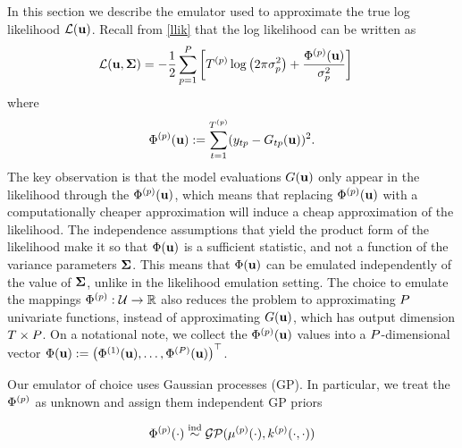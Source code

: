 \documentclass[12pt]{article}
\begin{document}
In this section we describe the emulator used to approximate the true log likelihood $\llik(\bpar)$. Recall from \ref{llik} that the log likelihood can be written as 
\begin{align*}
\llik(\bpar, \CovObs) &= -\frac{1}{2} \sum_{\objIdx = 1}^{\Nobj} \left[\indexObj{\Ntime} \log\left(2\postDens \sdObs_{\objIdx}^2 \right) + \frac{\indexObj{\SSR}(\bpar)}{\sdObs_{\objIdx}^2} \right] 
\end{align*}
where 
\[\indexObj{\SSR}(\bpar) := \sum_{\timeIdx = 1}^{\indexObj{\Ntime}} (\state_{\timeIdx \objIdx} - \fwd_{\timeIdx \objIdx}(\bpar))^2.\]
The key observation 
is that the model evaluations $\fwd(\bpar)$ only appear in the likelihood through the $\indexObj{\SSR}(\bpar)$, which means that replacing $\indexObj{\SSR}(\bpar)$ with a
computationally cheaper approximation will induce a cheap approximation of the likelihood. The independence assumptions 
that yield the product form of the likelihood make it so that $\SSR(\bpar)$ is a sufficient statistic, and not a function of the variance parameters $\CovObs$. 
This means that $\SSR(\bpar)$ can be emulated independently of the value of $\CovObs$, unlike in the likelihood emulation setting. 
The choice to emulate the mappings $\indexObj{\SSR}: \parSpace \to \R$ also reduces the problem to 
approximating $\Nobj$ univariate functions, instead of approximating $\fwd(\bpar)$, which has output dimension $\Ntime \times \Nobj$. On a notational note, we collect the $\indexObj{\SSR}(\bpar)$ values into a $\Nobj$-dimensional 
vector $\SSR(\bpar) := \begin{pmatrix} \indexObj[1]{\SSR}(\bpar), \dots, \indexObj[\Nobj]{\SSR}(\bpar) \end{pmatrix}^\top$.  

Our emulator of choice uses Gaussian processes (GP). In particular, we treat the $\indexObj{\SSR}$ as unknown and assign them independent GP priors

\[\indexObj{\SSR}(\cdot) \overset{\text{ind}}{\sim} \GP(\GPMeanOut{\objIdx}(\cdot), \GPKerOut{\objIdx}(\cdot, \cdot))\] 
\end{document}
